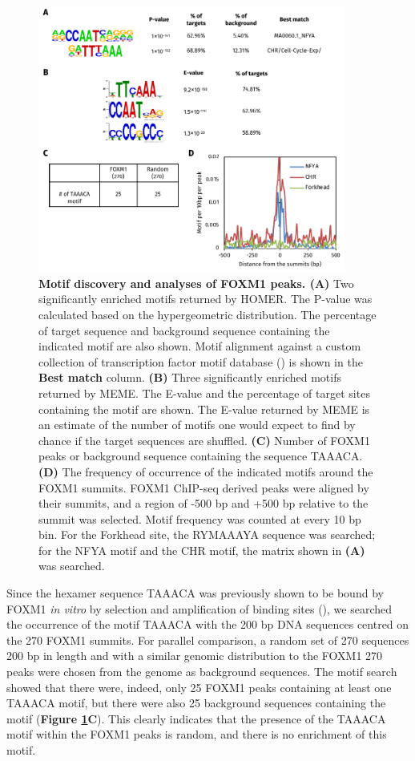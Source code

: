 \begin{figure}[!h]
    \centering
    \includegraphics[width=0.9\textwidth]{chapter3/figures_foxm1/fig22.pdf}
    \caption[Motif discovery and analyses of FOXM1 peaks]{\textbf{Motif discovery and analyses of FOXM1 peaks. (A)} Two significantly enriched motifs returned by HOMER. The P-value was calculated based on the hypergeometric distribution. The percentage of target sequence and background sequence containing the indicated motif are also shown. Motif alignment against a custom collection of transcription factor motif database (\cite{heinz2010simple}) is shown in the \textbf{Best match} column. \textbf{(B)} Three significantly enriched motifs returned by MEME. The E-value and the percentage of target sites containing the motif are shown. The E-value returned by MEME is an estimate of the number of motifs one would expect to find by chance if the target sequences are shuffled. \textbf{(C)} Number of FOXM1 peaks or background sequence containing the sequence TAAACA. \textbf{(D)} The frequency of occurrence of the indicated motifs around the FOXM1 summits. FOXM1 ChIP-seq derived peaks were aligned by their summits, and a region of -500 bp and +500 bp relative to the summit was selected. Motif frequency was counted at every 10 bp bin. For the Forkhead site, the RYMAAAYA sequence was searched; for the NFYA motif and the CHR motif, the matrix shown in \textbf{(A)} was searched.}
    \label{fig:fig22}
\end{figure}

Since the hexamer sequence TAAACA was previously shown to be bound by FOXM1 \textit{in vitro} by selection and amplification of binding sites (\cite{korver1997the}), we searched the occurrence of the motif TAAACA with the 200 bp DNA sequences centred on the 270 FOXM1 summits. For parallel comparison, a random set of 270 sequences 200 bp in length and with a similar genomic distribution to the FOXM1 270 peaks were chosen from the genome as background sequences. The motif search showed that there were, indeed, only 25 FOXM1 peaks containing at least one TAAACA motif, but there were also 25 background sequences containing the motif (\textbf{Figure \ref{fig:fig22}C}). This clearly indicates that the presence of the TAAACA motif within the FOXM1 peaks is random, and there is no enrichment of this motif.

